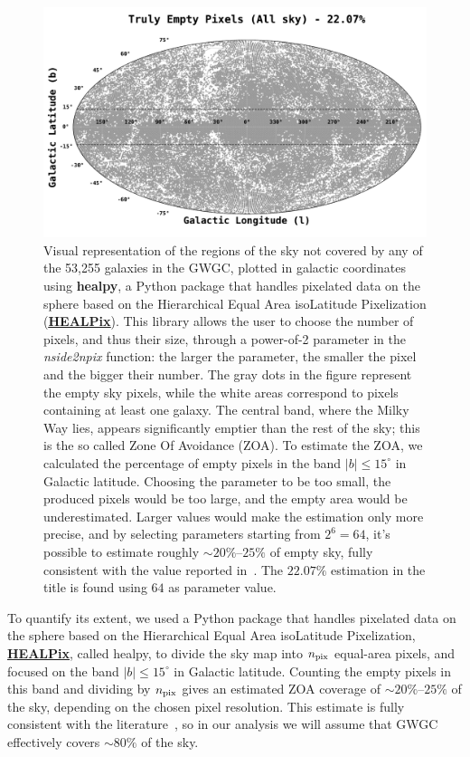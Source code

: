 \begin{figure}
    \begin{center}
        \includegraphics[width=\textwidth]{images/truly_empty_pixels.pdf}
    \end{center}
    \caption{Visual representation of the regions of the sky not covered by any of the 53,255 galaxies in the GWGC, plotted in galactic coordinates using \textbf{healpy}, a Python package that handles pixelated data on the sphere based on the Hierarchical Equal Area isoLatitude Pixelization (\underline{\textbf{\href{https://sourceforge.net/projects/healpix/}{HEALPix}}}). 
    This library allows the user to choose the number of pixels, and thus their size, through a power-of-2 parameter in the \textit{nside2npix} function: the larger the parameter, the smaller the pixel and the bigger their number. 
    The gray dots in the figure represent the empty sky pixels, while the white areas correspond to pixels containing at least one galaxy.
    The central band, where the Milky Way lies, appears significantly emptier than the rest of the sky; this is the so called Zone Of Avoidance (ZOA).
    To estimate the ZOA, we calculated the percentage of empty pixels in the band $|b| \leq 15^\circ$ in Galactic latitude.
    Choosing the parameter to be too small, the produced pixels would be too large, and the empty area would be underestimated.
    Larger values would make the estimation only more precise, and by selecting parameters starting from $2^6=64$, it's possible to estimate roughly $\sim20\%$–$25\%$ of empty sky, fully consistent with the value reported in~\cite{Kraan-Korteweg}.
    The $22.07\%$ estimation in the title is found using $64$ as parameter value.
    }\label{fig: ZOA in galactic coordinates}
\end{figure}
To quantify its extent, we used a Python package that handles pixelated data on the sphere based on the Hierarchical Equal Area isoLatitude Pixelization, \underline{\textbf{\href{https://sourceforge.net/projects/healpix/}{HEALPix}}}, called healpy, to divide the sky map into $n_{\rm pix}$ equal-area pixels, and focused on the band $|b| \leq 15^\circ$ in Galactic latitude.
Counting the empty pixels in this band and dividing by $n_{\rm pix}$ gives an estimated ZOA coverage of $\sim20\%$–$25\%$ of the sky, depending on the chosen pixel resolution.
This estimate is fully consistent with the literature~\cite{Kraan-Korteweg}, so in our analysis we will assume that GWGC effectively covers $\sim80\%$ of the sky.

